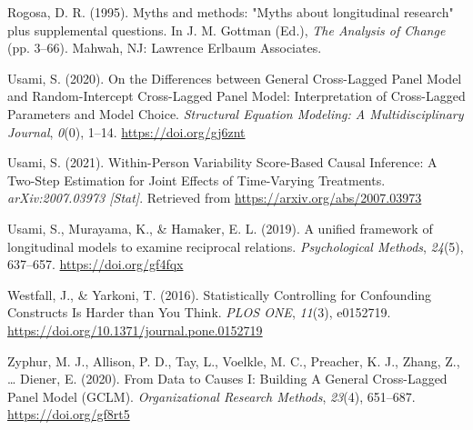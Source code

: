 \documentclass[
  english,
  man,floatsintext]{apa6}
\newlength{\cslhangindent}
\newlength{\cslentryspacingunit} %
\newenvironment{CSLReferences}[2] %
 {%
  \setlength{\parindent}{0pt}
  \ifodd #1
  \let\oldpar\par
  \def\par{\hangindent=\cslhangindent\oldpar}
  \fi
  \setlength{\parskip}{#2\cslentryspacingunit}
 }%
 {}
\begin{document}
\begin{CSLReferences}{1}{0}
\leavevmode{}%
Rogosa, D. R. (1995). Myths and methods: "{Myths} about longitudinal research" plus supplemental questions. In J. M. Gottman (Ed.), \emph{The {Analysis} of {Change}} (pp. 3--66). {Mahwah, NJ}: {Lawrence Erlbaum Associates}.

\leavevmode{}%
Usami, S. (2020). On the {Differences} between {General Cross-Lagged Panel Model} and {Random-Intercept Cross-Lagged Panel Model}: {Interpretation} of {Cross-Lagged Parameters} and {Model Choice}. \emph{Structural Equation Modeling: A Multidisciplinary Journal}, \emph{0}(0), 1--14. \url{https://doi.org/gj6znt}

\leavevmode{}%
Usami, S. (2021). Within-{Person Variability Score-Based Causal Inference}: {A Two-Step Estimation} for {Joint Effects} of {Time-Varying Treatments}. \emph{arXiv:2007.03973 {[}Stat{]}}. Retrieved from \url{https://arxiv.org/abs/2007.03973}

\leavevmode{}%
Usami, S., Murayama, K., \& Hamaker, E. L. (2019). A unified framework of longitudinal models to examine reciprocal relations. \emph{Psychological Methods}, \emph{24}(5), 637--657. \url{https://doi.org/gf4fqx}

\leavevmode{}%
Westfall, J., \& Yarkoni, T. (2016). Statistically {Controlling} for {Confounding Constructs Is Harder} than {You Think}. \emph{PLOS ONE}, \emph{11}(3), e0152719. \url{https://doi.org/10.1371/journal.pone.0152719}

\leavevmode{}%
Zyphur, M. J., Allison, P. D., Tay, L., Voelkle, M. C., Preacher, K. J., Zhang, Z., \ldots{} Diener, E. (2020). From {Data} to {Causes I}: {Building A General Cross-Lagged Panel Model} ({GCLM}). \emph{Organizational Research Methods}, \emph{23}(4), 651--687. \url{https://doi.org/gf8rt5}

\end{CSLReferences}


\clearpage
\makeatletter
\efloat@restorefloats
\makeatother
\end{document}
